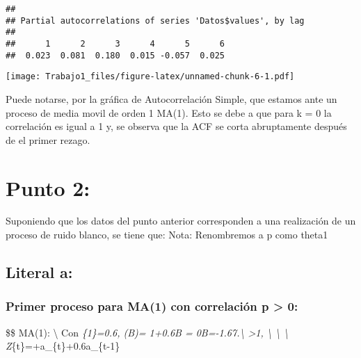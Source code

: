 \documentclass[
]{article}
\newenvironment{Shaded}{\begin{snugshade}}{\end{snugshade}}
\newcommand{\AttributeTok}[1]{\textcolor[rgb]{0.77,0.63,0.00}{#1}}
\newcommand{\DocumentationTok}[1]{\textcolor[rgb]{0.56,0.35,0.01}{\textbf{\textit{#1}}}}
\newcommand{\FunctionTok}[1]{\textcolor[rgb]{0.00,0.00,0.00}{#1}}
\newcommand{\NormalTok}[1]{#1}
\newcommand{\SpecialCharTok}[1]{\textcolor[rgb]{0.00,0.00,0.00}{#1}}
\newcommand{\StringTok}[1]{\textcolor[rgb]{0.31,0.60,0.02}{#1}}
\begin{document}
\begin{verbatim}
## 
## Partial autocorrelations of series 'Datos$values', by lag
## 
##      1      2      3      4      5      6 
##  0.023  0.081  0.180  0.015 -0.057  0.025
\end{verbatim}

\begin{Shaded}
\end{Shaded}

\texttt{[image: Trabajo1\_files/figure-latex/unnamed-chunk-6-1.pdf]}

Puede notarse, por la gráfica de Autocorrelación Simple, que estamos
ante un proceso de media movil de orden 1 MA(1). Esto se debe a que para
k = 0 la correlación es igual a 1 y, se observa que la ACF se corta
abruptamente después de el primer rezago.

\hypertarget{punto-2}{%
\section{Punto 2:}\label{punto-2}}

Suponiendo que los datos del punto anterior corresponden a una
realización de un proceso de ruido blanco, se tiene que: Nota:
Renombremos a p como theta1

\hypertarget{literal-a-1}{%
\subsection{Literal a:}\label{literal-a-1}}

\hypertarget{primer-proceso-para-ma1-con-correlaciuxf3n-p-0}{%
\subsubsection{Primer proceso para MA(1) con correlación p
\textgreater{}
0:}\label{primer-proceso-para-ma1-con-correlaciuxf3n-p-0}}

\$\$ MA(1): \textbackslash{} Con\hspace{0.2cm}
\theta\emph{\{1\}=0.6,\hspace{0.1cm} \theta(B)= 1+0.6B
= 0B=-1.67.\textbackslash{}
\textbar\textgreater1, \textbackslash{}
\textbackslash{}
\textbackslash{}
Z}\{t\}=\mu+a\_\{t\}+0.6a\_\{t-1\}
\end{document}
